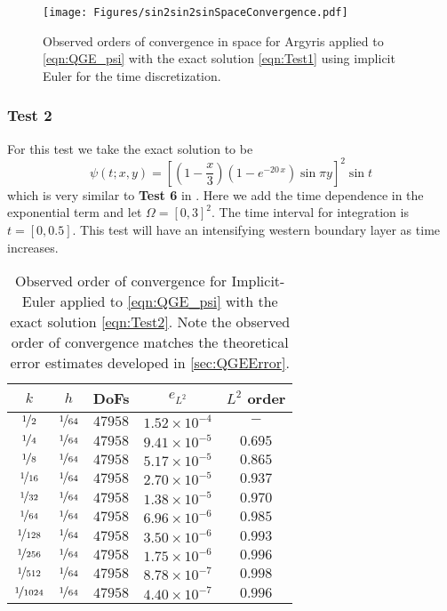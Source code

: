 \begin{figure}
  \begin{center}
    \texttt{[image: Figures/sin2sin2sinSpaceConvergence.pdf]}
    \caption{Observed orders of convergence in space for Argyris applied to
      \eqref{eqn:QGE_psi} with the exact solution \eqref{eqn:Test1} using
      implicit Euler for the time discretization.}
  \label{fig:Test1Space}
  \end{center}
\end{figure}

\subsubsection*{Test 2}
For this test we take the exact solution to be
\begin{equation}
  \psi(t;x,y) = \left[(1-\frac{x}{3})\left(1-e^{-20\,x}\right) \sin \pi
    y\right]^2 \sin t
  \label{eqn:Test2}
\end{equation}
which is very similar to \textbf{Test 6} in \cite{Foster}. Here we add the time
dependence in the exponential term and let $\Omega = [0,3]^2$. The time interval
for integration is $t = [0,0.5]$. This test will have an intensifying western
boundary layer as time increases.
\begin{table}
\begin{center}
  \begin{tabular}{|c|c|c|c|c|}
    \hline
    $k$ & $h$ & DoFs & $e_{L^2}$ & $L^2$ order \\
    \hline
    $\nicefrac{1}{2}$ & $\nicefrac{1}{64}$ & $47958$ & $1.52\times 10^{-4}$ & $-$\\
    $\nicefrac{1}{4}$ & $\nicefrac{1}{64}$ & $47958$ & $9.41\times 10^{-5}$ & $0.695$\\
    $\nicefrac{1}{8}$ & $\nicefrac{1}{64}$ & $47958$ & $5.17\times 10^{-5}$ & $0.865$\\
    $\nicefrac{1}{16}$ & $\nicefrac{1}{64}$ & $47958$ & $2.70\times 10^{-5}$ & $0.937$\\
    $\nicefrac{1}{32}$ & $\nicefrac{1}{64}$ & $47958$ & $1.38\times 10^{-5}$ & $0.970$\\
    $\nicefrac{1}{64}$ & $\nicefrac{1}{64}$ & $47958$ & $6.96\times 10^{-6}$ & $0.985$\\
    $\nicefrac{1}{128}$ & $\nicefrac{1}{64}$ & $47958$ & $3.50\times 10^{-6}$ & $0.993$\\
    $\nicefrac{1}{256}$ & $\nicefrac{1}{64}$ & $47958$ & $1.75\times 10^{-6}$ & $0.996$\\
    $\nicefrac{1}{512}$ & $\nicefrac{1}{64}$ & $47958$ & $8.78\times 10^{-7}$ & $0.998$\\
    $\nicefrac{1}{1024}$ & $\nicefrac{1}{64}$ & $47958$ & $4.40\times 10^{-7}$ & $0.996$\\
    \hline
  \end{tabular}
\end{center}
  \caption{Observed order of convergence for Implicit-Euler applied to
    \eqref{eqn:QGE_psi} with the exact solution \eqref{eqn:Test2}. Note the observed
    order of convergence matches the theoretical error estimates developed in
    \autoref{sec:QGEError}.}
  \label{tab:Test2Time}
\end{table}

